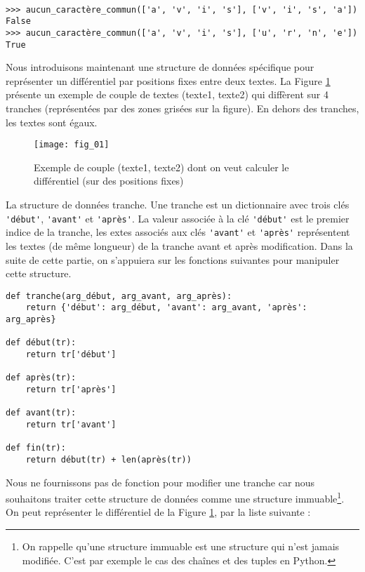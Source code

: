 \begin{exemple}~\\ 
\vspace{-.5cm}
\begin{lstlisting}
>>> aucun_caractère_commun(['a', 'v', 'i', 's'], ['v', 'i', 's', 'a'])
False
>>> aucun_caractère_commun(['a', 'v', 'i', 's'], ['u', 'r', 'n', 'e'])
True
\end{lstlisting}
\end{exemple}

Nous introduisons maintenant une structure de données spécifique pour représenter un différentiel par positions fixes entre deux textes.
La Figure \ref{fig:01} présente un exemple de couple de textes (texte1, texte2) qui diffèrent sur 4
tranches (représentées par des zones grisées sur la figure). En dehors des tranches, les textes sont
égaux.

\begin{figure}[H]
\centering
\texttt{[image: fig\_01]}
\caption{Exemple de couple (texte1, texte2) dont on veut calculer le différentiel (sur des
positions fixes) \label{fig:01}}
\end{figure}

\begin{defi}{La structure de données tranche.} Une tranche est un dictionnaire avec trois clés \lstinline{'début'},
\lstinline{'avant'} et \lstinline{'après'}. La valeur associée à la clé \lstinline{'début'} est le premier indice de la tranche, les
extes associés aux clés \lstinline{'avant'} et \lstinline{'après'} représentent les textes (de même longueur) de la tranche avant et après modification. Dans la suite de cette partie, on s'appuiera sur les fonctions
suivantes pour manipuler cette structure.
\end{defi}

\begin{lstlisting}
def tranche(arg_début, arg_avant, arg_après):
    return {'début': arg_début, 'avant': arg_avant, 'après': arg_après}

def début(tr):
    return tr['début']

def après(tr):
    return tr['après']

def avant(tr):
    return tr['avant']

def fin(tr):
    return début(tr) + len(après(tr))
\end{lstlisting}

Nous ne fournissons pas de fonction pour modifier une tranche car nous souhaitons traiter
cette structure de données comme une structure immuable\footnote{On rappelle qu'une structure immuable est une structure qui n'est jamais modifiée. C'est par exemple le
cas des chaînes et des tuples en Python.}.
On peut représenter le différentiel de la Figure \ref{fig:01}, par la liste suivante :

